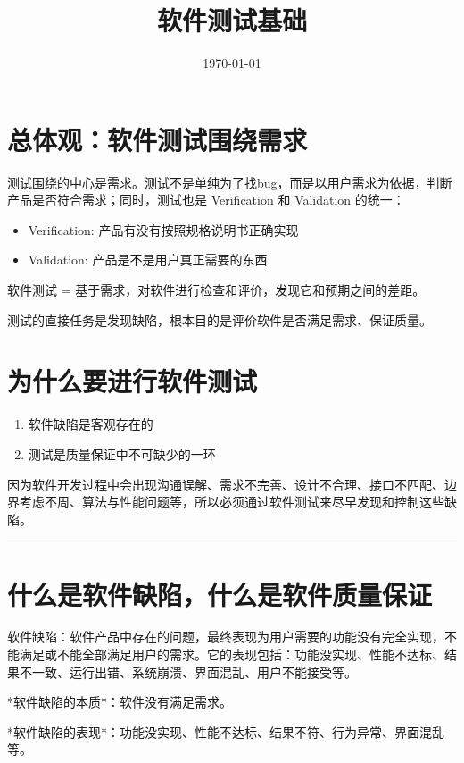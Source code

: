 \documentclass[11pt]{article}
\date{\today}
\title{软件测试基础}
\begin{document}
\maketitle
\tableofcontents

\section{总体观：软件测试围绕需求}
\label{sec:orgcf0d077}

测试围绕的中心是需求。测试不是单纯为了找bug，而是以用户需求为依据，判断产品是否符合需求；同时，测试也是 Verification 和 Validation 的统一：

\begin{itemize}
\item Verification: 产品有没有按照规格说明书正确实现
\item Validation: 产品是不是用户真正需要的东西
\end{itemize}


软件测试 = 基于需求，对软件进行检查和评价，发现它和预期之间的差距。

测试的直接任务是发现缺陷，根本目的是评价软件是否满足需求、保证质量。
\section{为什么要进行软件测试}
\label{sec:orge5c8a24}

\begin{enumerate}
\item 软件缺陷是客观存在的
\item 测试是质量保证中不可缺少的一环
\end{enumerate}


因为软件开发过程中会出现沟通误解、需求不完善、设计不合理、接口不匹配、边界考虑不周、算法与性能问题等，所以必须通过软件测试来尽早发现和控制这些缺陷。

\noindent\rule{\textwidth}{0.5pt}
\section{什么是软件缺陷，什么是软件质量保证}
\label{sec:org900c1da}
软件缺陷：软件产品中存在的问题，最终表现为用户需要的功能没有完全实现，不能满足或不能全部满足用户的需求。它的表现包括：功能没实现、性能不达标、结果不一致、运行出错、系统崩溃、界面混乱、用户不能接受等。

*软件缺陷的本质*：软件没有满足需求。

*软件缺陷的表现*：功能没实现、性能不达标、结果不符、行为异常、界面混乱等。
\end{document}
